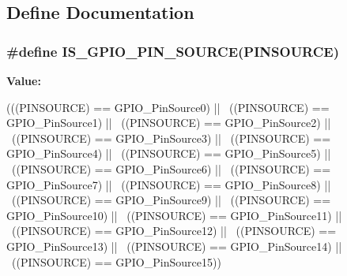 \subsection{Define Documentation}
\hypertarget{group__GPIO__Pin__sources_ga689e4e72591136b6a8d4df9d895181f7}{
\subsubsection[{IS\_\-GPIO\_\-PIN\_\-SOURCE}]{\setlength{\rightskip}{0pt plus 5cm}\#define IS\_\-GPIO\_\-PIN\_\-SOURCE(PINSOURCE)}}
\label{group__GPIO__Pin__sources_ga689e4e72591136b6a8d4df9d895181f7}
{\bfseries Value:}
\begin{DoxyCode}
(((PINSOURCE) == GPIO_PinSource0) || \
                                       ((PINSOURCE) == GPIO_PinSource1) || \
                                       ((PINSOURCE) == GPIO_PinSource2) || \
                                       ((PINSOURCE) == GPIO_PinSource3) || \
                                       ((PINSOURCE) == GPIO_PinSource4) || \
                                       ((PINSOURCE) == GPIO_PinSource5) || \
                                       ((PINSOURCE) == GPIO_PinSource6) || \
                                       ((PINSOURCE) == GPIO_PinSource7) || \
                                       ((PINSOURCE) == GPIO_PinSource8) || \
                                       ((PINSOURCE) == GPIO_PinSource9) || \
                                       ((PINSOURCE) == GPIO_PinSource10) || \
                                       ((PINSOURCE) == GPIO_PinSource11) || \
                                       ((PINSOURCE) == GPIO_PinSource12) || \
                                       ((PINSOURCE) == GPIO_PinSource13) || \
                                       ((PINSOURCE) == GPIO_PinSource14) || \
                                       ((PINSOURCE) == GPIO_PinSource15))
\end{DoxyCode}

